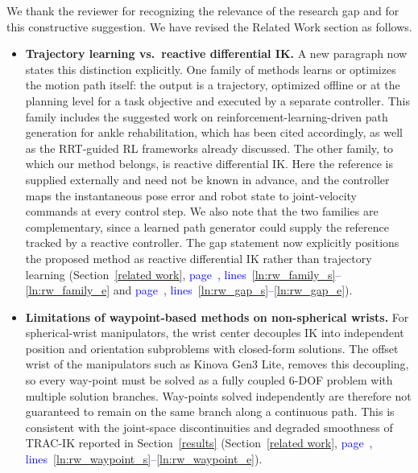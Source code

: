 \documentclass[11pt]{elsarticle}
\newcommand{\mlines}[2]{\textcolor{blue}{page~\pageref{#1}, lines~\ref{#1}--\ref{#2}}}
\begin{document}
\begin{responsebox}
We thank the reviewer for recognizing the relevance of the research gap and for this constructive suggestion. We have revised the Related Work section as follows.

\begin{itemize}
  \item \textbf{Trajectory learning vs.\ reactive differential IK.} A new paragraph now states this distinction explicitly. One family of methods learns or optimizes the motion path itself: the output is a trajectory, optimized offline or at the planning level for a task objective and executed by a separate controller. This family includes the suggested work on reinforcement-learning-driven path generation for ankle rehabilitation, which has been cited accordingly, as well as the RRT-guided RL frameworks already discussed. The other family, to which our method belongs, is reactive differential IK. Here the reference is supplied externally and need not be known in advance, and the controller maps the instantaneous pose error and robot state to joint-velocity commands at every control step. We also note that the two families are complementary, since a learned path generator could supply the reference tracked by a reactive controller. The gap statement now explicitly positions the proposed method as reactive differential IK rather than trajectory learning (Section~\ref{related work}, \mlines{ln:rw_family_s}{ln:rw_family_e} and \mlines{ln:rw_gap_s}{ln:rw_gap_e}).

  \item \textbf{Limitations of waypoint-based methods on non-spherical wrists.} For spherical-wrist manipulators, the wrist center decouples IK into independent position and orientation subproblems with closed-form solutions. The offset wrist of the manipulators such as  Kinova Gen3 Lite, removes this decoupling, so every way-point must be solved as a fully coupled 6-DOF problem with multiple solution branches. Way-points solved independently are therefore not guaranteed to remain on the same branch along a continuous path. This is consistent with the joint-space discontinuities and degraded smoothness of TRAC-IK reported in Section~\ref{results} (Section~\ref{related work}, \mlines{ln:rw_waypoint_s}{ln:rw_waypoint_e}).


\end{itemize}
\end{responsebox}
\end{document}
